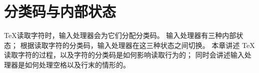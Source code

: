 \documentclass{book}
\begin{document}
\chapter{分类码与内部状态}\label{mouth}

\TeX 读取字符时，输入处理器会为它们分配分类码。
输入处理器有三种内部状态；
根据读取字符的分类码，输入处理器在这三种状态之间切换。
本章讲述 \TeX 读取字符的过程，以及字符的分类码是如何影响读取行为的；
同时会讲述输入处理器是如何处理空格以及行末的情形的。
\end{document}
